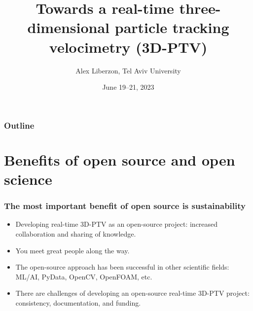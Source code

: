 \documentclass[aspectratio=169]{beamer}
\title{Towards a real-time three-dimensional particle tracking velocimetry (3D-PTV)}
\date{June 19--21, 2023}
\author[Liberzon]{Alex Liberzon, Tel Aviv University}
\begin{document}
\begin{frame}
    \titlepage
\end{frame}

\begin{frame}\frametitle{Outline}
    \begin{card}	
    \tableofcontents
    \end{card}
\end{frame}














\section{Benefits of open source and open science}

\begin{frame}
\frametitle{The most important benefit of open source is sustainability}
\begin{itemize}
\item Developing real-time 3D-PTV as an open-source project: increased collaboration and sharing of knowledge. 
\item You meet great people along the way.
\item The open-source approach has been successful in other scientific fields: ML/AI, PyData, OpenCV, OpenFOAM, etc.
\item There are challenges of developing an open-source real-time 3D-PTV project: consistency, documentation, and funding.
\end{itemize}
\end{frame}


\end{document}
